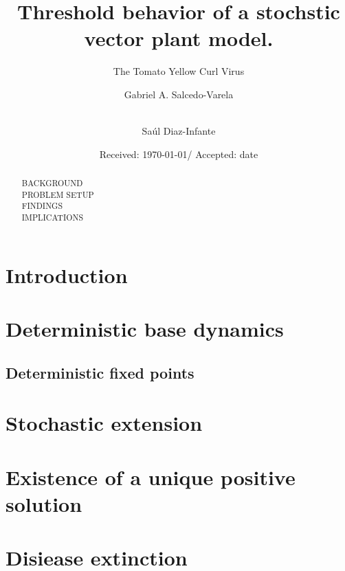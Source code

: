 \documentclass[smallextended]{svjour3}
\begin{document}
	\title{%
		Threshold behavior of a stochstic vector plant model.
	}
	\subtitle{%
		The Tomato Yellow Curl Virus
	}
	\author{%
		Gabriel A. Salcedo-Varela  \and 
		\\
		Sa\'ul Diaz-Infante 
	}
	\date{Received: \today / Accepted: date}
	\maketitle
	\begin{abstract}
		BACKGROUND
		\\
		PROBLEM SETUP
		\\
		FINDINGS 
		\\
		IMPLICATIONS
	\end{abstract}
	\section{Introduction}
	\section{Deterministic base dynamics}
		\label{sec:model_formulation}
		
		\subsection{Deterministic fixed points}
			
	\section{Stochastic extension}
		
	\section{Existence of a unique positive solution}
		\label{sec:solution_existence}
		
	\section{Disiease extinction}
		\label{extinction}
		
		
\end{document}
